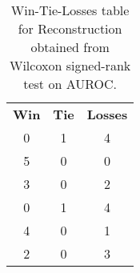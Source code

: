 \begin{table}
\centering
\caption{Win-Tie-Losses table for Reconstruction obtained from Wilcoxon signed-rank test on AUROC.}
\label{tab:reconstruction_model_comparison_AUROC}
\begin{tabular}{|c|c|c|}
\toprule
 \textbf{Win} &  \textbf{Tie} &  \textbf{Losses} \\
            0 &             1 &                4 \\
\midrule
            5 &             0 &                0 \\
            3 &             0 &                2 \\
            0 &             1 &                4 \\
            4 &             0 &                1 \\
            2 &             0 &                3 \\
\bottomrule
\end{tabular}
\end{table}
